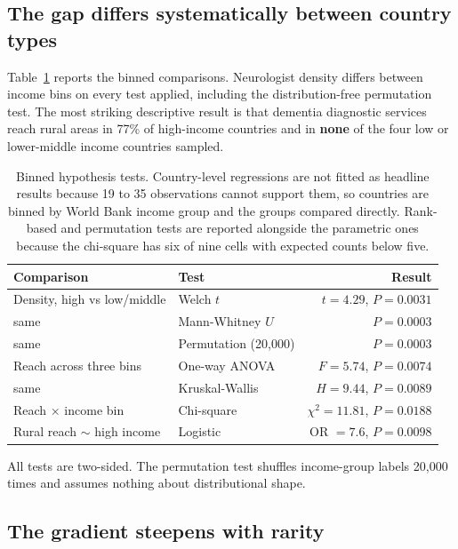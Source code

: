 \documentclass[10pt]{article}
\newcommand{\addtabletext}[1]{\par\vspace{4pt}\footnotesize #1\par}
\begin{document}
\subsection*{The gap differs systematically between country types}

Table~\ref{tab:tests} reports the binned comparisons. Neurologist density
differs between income bins on every test applied, including the
distribution-free permutation test. The most striking descriptive result is that
dementia diagnostic services reach rural areas in 77\% of high-income countries
and in \textbf{none} of the four low or lower-middle income countries sampled.

\begin{table}[t!]
\centering
\caption{Binned hypothesis tests. Country-level regressions are not fitted as
headline results because 19 to 35 observations cannot support them, so countries
are binned by World Bank income group and the groups compared directly. Rank-based
and permutation tests are reported alongside the parametric ones because the
chi-square has six of nine cells with expected counts below five.}
\label{tab:tests}
\begin{tabular}{llr}
\toprule
Comparison & Test & Result \\
\midrule
Density, high vs low/middle & Welch $t$ & $t = 4.29$, $P = 0.0031$ \\
\quad same & Mann-Whitney $U$ & $P = 0.0003$ \\
\quad same & Permutation (20{,}000) & $P = 0.0003$ \\
Reach across three bins & One-way ANOVA & $F = 5.74$, $P = 0.0074$ \\
\quad same & Kruskal-Wallis & $H = 9.44$, $P = 0.0089$ \\
Reach $\times$ income bin & Chi-square & $\chi^2 = 11.81$, $P = 0.0188$ \\
Rural reach $\sim$ high income & Logistic & OR $= 7.6$, $P = 0.0098$ \\
\bottomrule
\end{tabular}

\addtabletext{All tests are two-sided. The permutation test shuffles income-group
labels 20{,}000 times and assumes nothing about distributional shape.}
\end{table}

\subsection*{The gradient steepens with rarity}
\end{document}
